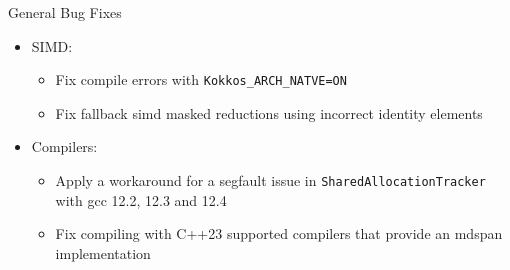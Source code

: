 




\begin{frame}[fragile]{General Bug Fixes}
  \begin{itemize}
    \item SIMD:
    \begin{itemize}
      \item Fix compile errors with \texttt{Kokkos\_ARCH\_NATVE=ON} %
      \item Fix fallback simd masked reductions using incorrect identity elements %
    \end{itemize}
    \item Compilers:
    \begin{itemize}
      \item Apply a workaround for a segfault issue in \texttt{SharedAllocationTracker} with gcc 12.2, 12.3 and 12.4 %
      \item Fix compiling with C++23 supported compilers that provide an mdspan implementation %
    \end{itemize}
  \end{itemize}
\end{frame}


